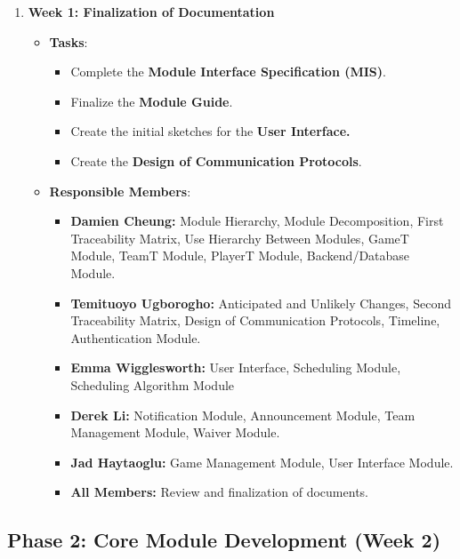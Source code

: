\documentclass[12pt, titlepage]{article}
\begin{document}
\begin{enumerate}
  \item \textbf{Week 1: Finalization of Documentation}
        \begin{itemize}
          \item \textbf{Tasks}:
                \begin{itemize}
                  \item Complete the \textbf{Module Interface Specification (MIS)}.
                  \item Finalize the \textbf{Module Guide}.
                  \item Create the initial sketches for the \textbf{User Interface.}
                  \item Create the \textbf{Design of Communication Protocols}.
                \end{itemize}
          \item \textbf{Responsible Members}:
                \begin{itemize}
                  \item \textbf{Damien Cheung:} Module Hierarchy, Module Decomposition, First Traceability Matrix, Use Hierarchy Between Modules,
                        GameT Module, TeamT Module, PlayerT Module, Backend/Database Module.
                  \item \textbf{Temituoyo Ugborogho:} Anticipated and Unlikely Changes, Second Traceability Matrix, Design of Communication Protocols,
                        Timeline, Authentication Module.
                  \item \textbf{Emma Wigglesworth:} User Interface, Scheduling Module, Scheduling Algorithm Module
                  \item \textbf{Derek Li:} Notification Module, Announcement Module, Team Management Module, Waiver Module.
                  \item \textbf{Jad Haytaoglu:} Game Management Module, User Interface Module.
                  \item \textbf{All Members:} Review and finalization of documents.
                \end{itemize}
        \end{itemize}
\end{enumerate}

\subsection*{Phase 2: Core Module Development (Week 2)}
\end{document}
